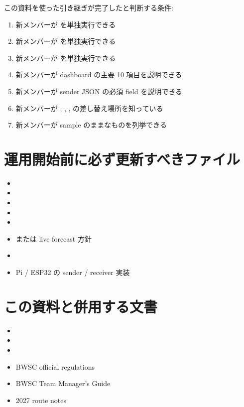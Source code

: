 \documentclass[a4paper,11pt]{article}
\begin{document}
この資料を使った引き継ぎが完了したと判断する条件:

\begin{enumerate}
  \item 新メンバーが  を単独実行できる
  \item 新メンバーが  を単独実行できる
  \item 新メンバーが  を単独実行できる
  \item 新メンバーが dashboard の主要 10 項目を説明できる
  \item 新メンバーが sender JSON の必須 field を説明できる
  \item 新メンバーが , , ,  の差し替え場所を知っている
  \item 新メンバーが sample のままなものを列挙できる
\end{enumerate}

\section{運用開始前に必ず更新すべきファイル}

\begin{itemize}
  \item {}
  \item {}
  \item {}
  \item {}
  \item {}
  \item {} または live forecast 方針
  \item {}
  \item Pi / ESP32 の sender / receiver 実装
\end{itemize}

\section{この資料と併用する文書}

\begin{itemize}
  \item {}
  \item {}
  \item {}
  \item BWSC official regulations
  \item BWSC Team Manager's Guide
  \item 2027 route notes
\end{itemize}
\end{document}
